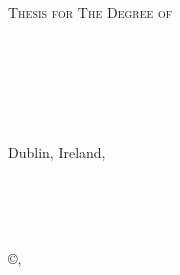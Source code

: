 
\thispagestyle{empty} %
\begin{center}
  \textsc{Thesis for The Degree of \degreetitle}\\
\end{center}

\vspace{4cm}

\begin{center} {\LARGE \textbf{\mytitle}}\\
\ifx\mysubtitle\undefined
\else
  \vspace{4mm}
  \textit{\large\mysubtitle}
\fi
\end{center}

\ifx\mysubtitle\undefined
\vspace{5mm}
\else
\vspace{2mm}
\fi

\begin{center}
\textsc{\large\authorname} \\
\end{center}

\vfill

\begin{center}
\textit{\mydepartment}\\
\textsc{\chalIgu}\\
Dublin, Ireland, \currentyear \\
\end{center}

\newpage
\thispagestyle{empty}

\vspace{2cm} \noindent \textbf
\mytitle\\
\ifx\mysubtitle\undefined
\else
  \textit{\small\mysubtitle}
  \\
\fi

\noindent
\textsc{\authorname}\\

\vskip 0.5cm\noindent
\copyright \space \authorname,~\currentyear  \\
\noindent
\vspace{1cm}


